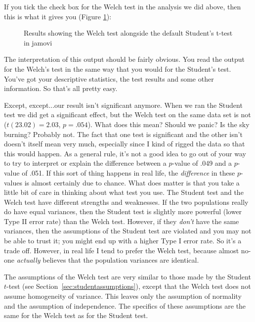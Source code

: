 
If you tick the check box for the Welch test in the analysis we did above, then this is what it gives you (Figure \ref{fig:ttest_welch}):

\begin{figure}[htb]
\begin{center}
\caption{Results showing the Welch test alongside the default Student's t-test in jamovi}
\HR
\label{fig:ttest_welch}
\end{center}
\end{figure}

The interpretation of this output should be fairly obvious. You read the output for the Welch's test in the same way that you would for the Student's test. You've got your descriptive statistics, the test results and some other information. So that's all pretty easy. 

Except, except...our result isn't significant anymore. When we ran the Student test we did get a significant effect, but the Welch test on the same data set is not ($t(23.02) = 2.03$, $p = .054$). What does this mean? Should we panic? Is the sky burning? Probably not. The fact that one test is significant and the other isn't doesn't itself mean very much, especially since I kind of rigged the data so that this would happen. As a general rule, it's not a good idea to go out of your way to try to interpret or explain the difference between a $p$-value of .049 and a $p$-value of .051. If this sort of thing happens in real life, the {\it difference} in these $p$-values is almost certainly due to chance. What does matter is that you take a little bit of care in thinking about what test you use. The Student test and the Welch test have different strengths and weaknesses. If the two populations really do have equal variances, then the Student test is slightly more powerful (lower Type II error rate) than the Welch test. However, if they {\it don't} have the same variances, then the assumptions of the Student test are violated and you may not be able to trust it; you might end up with a higher Type I error rate. So it's a trade off. However, in real life I tend to prefer the Welch test, because almost no-one {\it actually} believes that the population variances are identical.


The assumptions of the Welch test are very similar to those made by the Student $t$-test (see Section~\ref{sec:studentassumptions}), except that the Welch test does not assume homogeneity of variance. This leaves only the assumption of normality and the assumption of independence. The specifics of these assumptions are the same for the Welch test as for the Student test. 

